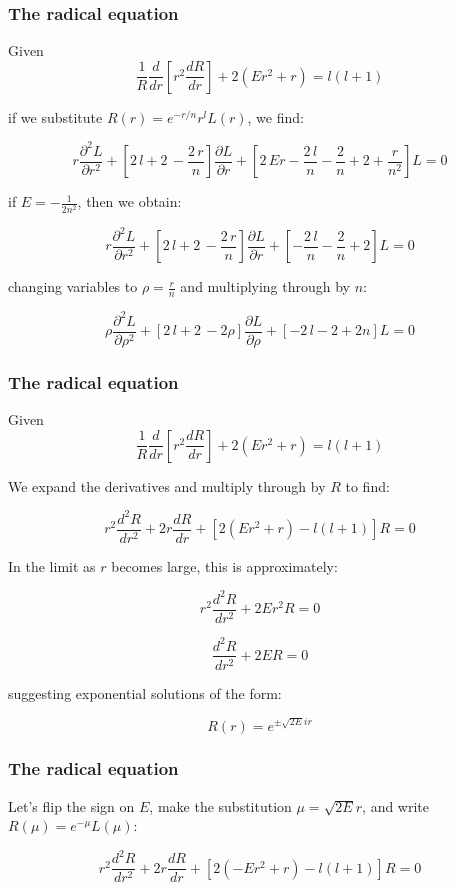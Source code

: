\documentclass{beamer}
\begin{document}
\begin{frame}
\frametitle{The radical equation}
Given
\[ \frac{1}{R} \frac{d}{dr}\left[ r^2 \frac{dR}{dr}\right] + 2(Er^2 + r) = l(l+1) \]

if we substitute $R(r) = e^{-r/n} r^l L(r)$, we find:

\[
r \frac{\partial^{2}L}{\partial r^{2}}
+ \left[ 2 \, l + 2 \, - \frac{2 \, r }{n} \right] \frac{\partial L}{\partial r}
+ \left[ 2 \, E r - \frac{2 \, l}{n}
- \frac{2}{n}
+ 2
+ \frac{r }{n^{2}} \right] L
= 0
\]

if $E=-\frac{1}{2n^2}$, then we obtain:

\[
r \frac{\partial^{2}L}{\partial r^{2}}
+ \left[ 2 \, l + 2 \, - \frac{2 \, r }{n} \right] \frac{\partial L}{\partial r}
+ \left[ - \frac{2 \, l}{n}
- \frac{2}{n}
+ 2 \right] L
= 0
\]

changing variables to $\rho = \frac{r}{n}$ and multiplying through by $n$:

\[
\rho \frac{\partial^{2}L}{\partial \rho^{2}}
+ \left[ 2 \, l + 2 \, - 2\rho \right] \frac{\partial L}{\partial \rho}
+ \left[ - 2 \, l - 2 + 2 n \right] L
= 0
\]

\end{frame}


\begin{frame}
\frametitle{The radical equation}
Given
\[ \frac{1}{R} \frac{d}{dr}\left[ r^2 \frac{dR}{dr}\right] + 2(Er^2 + r) = l(l+1) \]

We expand the derivatives and multiply through by $R$ to find:

\[ r^2 \frac{d^2R}{dr^2} + 2r \frac{dR}{dr} + \left[2(E r^2+r) - l(l+1)\right] R = 0 \]

In the limit as $r$ becomes large, this is approximately:

\[ r^2 \frac{d^2R}{dr^2} + 2E r^2 R = 0 \]

\[ \frac{d^2R}{dr^2} + 2E R = 0 \]

suggesting exponential solutions of the form:

\[ R(r) = e^{\pm \sqrt{2E}ir} \]

\end{frame}

\begin{frame}
\frametitle{The radical equation}
Let's flip the sign on $E$, make the substitution $\mu = \sqrt{2E} r$, and write $R(\mu)=e^{-\mu}L(\mu)$:

\[ r^2 \frac{d^2R}{dr^2} + 2r \frac{dR}{dr} + \left[2(-E r^2+r) - l(l+1)\right] R = 0 \]
\end{frame}
\end{document}
